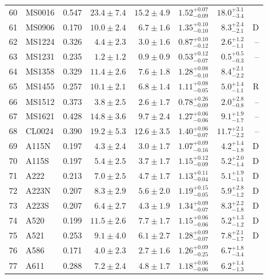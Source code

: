 \documentclass[useAMS,usenatbib]{mnras}
\begin{document}
\begin{table}
\begin{tabularx}{1.0\textwidth}{ l l r r r r r r}
60 & MS0016 & 0.547 & $23.4 \pm 7.4$ & $15.2 \pm 4.9$ & $1.52_{-0.09}^{+0.07}$ & $18.0_{-3.4}^{+3.1}$ &  \\
61 & MS0906 & 0.170 & $10.0 \pm 2.4$ & $6.7 \pm 1.6$ & $1.35_{-0.10}^{+0.10}$ & $8.3_{-2.1}^{+2.4}$ & D \\
62 & MS1224 & 0.326 & $4.4 \pm 2.3$ & $3.0 \pm 1.6$ & $0.87_{-0.12}^{+0.10}$ & $2.6_{-1.1}^{+1.2}$ & -- \\
63 & MS1231 & 0.235 & $1.2 \pm 1.2$ & $0.9 \pm 0.9$ & $0.53_{-0.07}^{+0.12}$ & $0.5_{-0.3}^{+0.5}$ & -- \\
64 & MS1358 & 0.329 & $11.4 \pm 2.6$ & $7.6 \pm 1.8$ & $1.28_{-0.10}^{+0.08}$ & $8.4_{-2.2}^{+2.1}$ &  \\
65 & MS1455 & 0.257 & $10.1 \pm 2.1$ & $6.8 \pm 1.4$ & $1.11_{-0.05}^{+0.08}$ & $5.0_{-1.1}^{+1.4}$ & R \\
66 & MS1512 & 0.373 & $3.8 \pm 2.5$ & $2.6 \pm 1.7$ & $0.78_{-0.09}^{+0.26}$ & $2.0_{-0.8}^{+2.8}$ & -- \\
67 & MS1621 & 0.428 & $14.8 \pm 3.6$ & $9.7 \pm 2.4$ & $1.27_{-0.06}^{+0.06}$ & $9.1_{-1.7}^{+1.9}$ & -- \\
68 & CL0024 & 0.390 & $19.2 \pm 5.3$ & $12.6 \pm 3.5$ & $1.40_{-0.07}^{+0.06}$ & $11.7_{-2.2}^{+2.1}$ & -- \\
69 & A115N & 0.197 & $4.3 \pm 2.4$ & $3.0 \pm 1.7$ & $1.07_{-0.16}^{+0.09}$ & $4.2_{-1.8}^{+1.4}$ & D \\
70 & A115S & 0.197 & $5.4 \pm 2.5$ & $3.7 \pm 1.7$ & $1.15_{-0.09}^{+0.12}$ & $5.2_{-1.4}^{+2.0}$ & D \\
71 & A222 & 0.213 & $7.0 \pm 2.5$ & $4.7 \pm 1.7$ & $1.13_{-0.04}^{+0.11}$ & $5.1_{-1.1}^{+1.9}$ & D \\
72 & A223N & 0.207 & $8.3 \pm 2.9$ & $5.6 \pm 2.0$ & $1.19_{-0.05}^{+0.15}$ & $5.9_{-1.2}^{+2.8}$ & D \\
73 & A223S & 0.207 & $6.4 \pm 2.7$ & $4.3 \pm 1.9$ & $1.34_{-0.07}^{+0.09}$ & $8.3_{-1.8}^{+2.2}$ & D \\
74 & A520 & 0.199 & $11.5 \pm 2.6$ & $7.7 \pm 1.7$ & $1.15_{-0.06}^{+0.06}$ & $5.2_{-1.2}^{+1.3}$ & D \\
75 & A521 & 0.253 & $9.1 \pm 4.0$ & $6.1 \pm 2.7$ & $1.28_{-0.07}^{+0.09}$ & $7.8_{-1.7}^{+2.1}$ & D \\
76 & A586 & 0.171 & $4.0 \pm 2.3$ & $2.7 \pm 1.6$ & $1.26_{-0.25}^{+0.09}$ & $6.7_{-3.4}^{+1.8}$ &  \\
77 & A611 & 0.288 & $7.2 \pm 2.4$ & $4.8 \pm 1.7$ & $1.18_{-0.06}^{+0.06}$ & $6.2_{-1.3}^{+1.4}$ &  \\

\end{tabularx}
\end{table}
\end{document}
